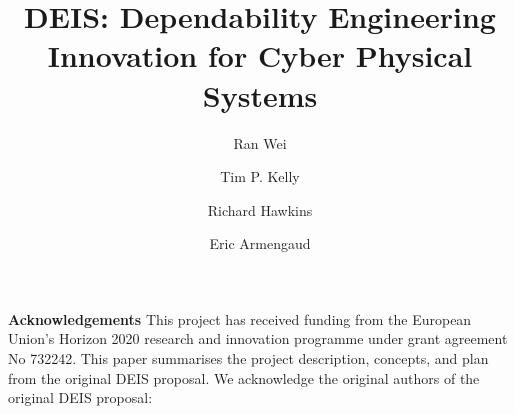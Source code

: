 \documentclass[runningheads,a4paper]{llncs}
\begin{document}
 
\title{\textbf{DEIS: Dependability Engineering Innovation for Cyber Physical Systems}}
\author{Ran Wei \and Tim P. Kelly \and Richard Hawkins 
\and Eric Armengaud 
}
\maketitle

















\noindent\textbf{Acknowledgements}
This project has received funding from the European Union’s Horizon 2020 research and innovation programme under grant agreement No 732242. This paper summarises the project description, concepts, and plan from the original DEIS proposal. We acknowledge the original authors of the original DEIS proposal: 

\end{document}
